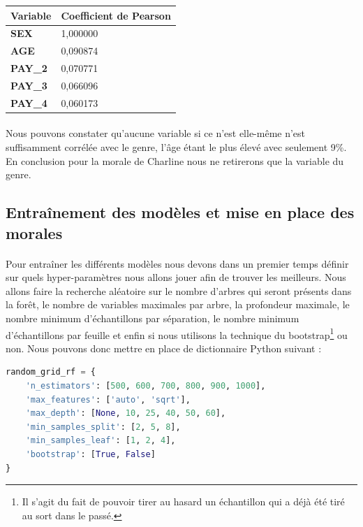 \documentclass[10pt, french, a4paper]{report}
\begin{document}
\begin{center}
  \begin{tabular}{ |l|l| } 
    \hline
    Variable & Coefficient de Pearson  \\
    \hline
    \hline
    \textbf{SEX} & 1,000000 \\
    \textbf{AGE} & 0,090874 \\
    \textbf{PAY\_2} & 0,070771 \\
    \textbf{PAY\_3} & 0,066096 \\
    \textbf{PAY\_4} & 0,060173 \\
    \hline
  \end{tabular}
\end{center}


\paragraph{}
Nous pouvons constater qu'aucune variable si ce n'est elle-même n'est suffisamment corrélée avec le genre, l'âge étant le plus élevé avec seulement 9\%. En conclusion pour la morale de Charline nous ne retirerons que la variable du genre.

\subsection{Entraînement des modèles et mise en place des morales}

\paragraph{}
Pour entraîner les différents modèles nous devons dans un premier temps définir sur quels hyper-paramètres nous allons jouer afin de trouver les meilleurs. Nous allons faire la recherche aléatoire sur le nombre d'arbres qui seront présents dans la forêt, le nombre de variables maximales par arbre, la profondeur maximale, le nombre minimum d'échantillons par séparation, le nombre minimum d'échantillons par feuille et enfin si nous utilisons la technique du bootstrap\footnote{Il s'agit du fait de pouvoir tirer au hasard un échantillon qui a déjà été tiré au sort dans le passé.} ou non. Nous pouvons donc mettre en place de dictionnaire Python suivant :

\begin{lstlisting}[language=python]
  random_grid_rf = { 
    'n_estimators': [500, 600, 700, 800, 900, 1000],
    'max_features': ['auto', 'sqrt'],
    'max_depth': [None, 10, 25, 40, 50, 60],
    'min_samples_split': [2, 5, 8],
    'min_samples_leaf': [1, 2, 4],
    'bootstrap': [True, False]
}
\end{lstlisting}
\end{document}
